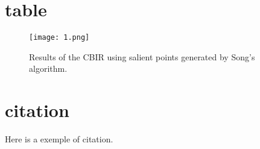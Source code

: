 \documentclass[10pt,twocolumn,letterpaper]{article}
\begin{document}
\section{table}

	\begin{figure}[H]
	\begin{center}
	   \texttt{[image: 1.png]}
	\end{center}
	   \caption{ Results of the CBIR using salient points generated by
	Song’s algorithm.}
	\label{img3}
	\end{figure}
\section{citation}

Here is a exemple of citation\cite{Fiala2006Using}.

{\small


}
\end{document}
